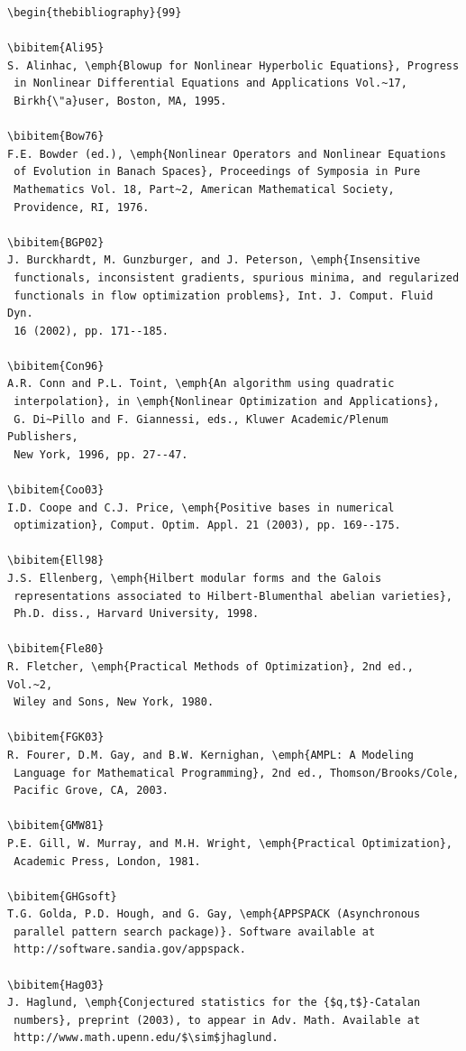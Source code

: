 \documentclass[]{interact}
\theoremstyle{plain}%
\theoremstyle{definition}
\theoremstyle{remark}
\begin{document}
\begin{verbatim}
\begin{thebibliography}{99}

\bibitem{Ali95}
S. Alinhac, \emph{Blowup for Nonlinear Hyperbolic Equations}, Progress
 in Nonlinear Differential Equations and Applications Vol.~17,
 Birkh{\"a}user, Boston, MA, 1995.

\bibitem{Bow76}
F.E. Bowder (ed.), \emph{Nonlinear Operators and Nonlinear Equations
 of Evolution in Banach Spaces}, Proceedings of Symposia in Pure
 Mathematics Vol. 18, Part~2, American Mathematical Society,
 Providence, RI, 1976.

\bibitem{BGP02}
J. Burckhardt, M. Gunzburger, and J. Peterson, \emph{Insensitive
 functionals, inconsistent gradients, spurious minima, and regularized
 functionals in flow optimization problems}, Int. J. Comput. Fluid Dyn.
 16 (2002), pp. 171--185.

\bibitem{Con96}
A.R. Conn and P.L. Toint, \emph{An algorithm using quadratic
 interpolation}, in \emph{Nonlinear Optimization and Applications},
 G. Di~Pillo and F. Giannessi, eds., Kluwer Academic/Plenum Publishers,
 New York, 1996, pp. 27--47.

\bibitem{Coo03}
I.D. Coope and C.J. Price, \emph{Positive bases in numerical
 optimization}, Comput. Optim. Appl. 21 (2003), pp. 169--175.

\bibitem{Ell98}
J.S. Ellenberg, \emph{Hilbert modular forms and the Galois
 representations associated to Hilbert-Blumenthal abelian varieties},
 Ph.D. diss., Harvard University, 1998.

\bibitem{Fle80}
R. Fletcher, \emph{Practical Methods of Optimization}, 2nd ed., Vol.~2,
 Wiley and Sons, New York, 1980.

\bibitem{FGK03}
R. Fourer, D.M. Gay, and B.W. Kernighan, \emph{AMPL: A Modeling
 Language for Mathematical Programming}, 2nd ed., Thomson/Brooks/Cole,
 Pacific Grove, CA, 2003.

\bibitem{GMW81}
P.E. Gill, W. Murray, and M.H. Wright, \emph{Practical Optimization},
 Academic Press, London, 1981.

\bibitem{GHGsoft}
T.G. Golda, P.D. Hough, and G. Gay, \emph{APPSPACK (Asynchronous
 parallel pattern search package)}. Software available at
 http://software.sandia.gov/appspack.

\bibitem{Hag03}
J. Haglund, \emph{Conjectured statistics for the {$q,t$}-Catalan
 numbers}, preprint (2003), to appear in Adv. Math. Available at
 http://www.math.upenn.edu/$\sim$jhaglund.


\end{verbatim}
\end{document}
